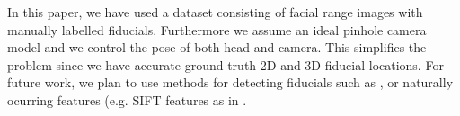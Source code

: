 \documentclass[runningheads]{llncs}
\begin{document}
In this paper, we have used a dataset consisting of facial range images with manually labelled fiducials.    
Furthermore we assume an ideal pinhole camera model and we control the pose of both head and camera.  
This simplifies the problem since we have accurate ground truth 2D and 3D fiducial locations. 
For future work, we plan to use methods for detecting fiducials such as \cite{belhumeur2011localizing}, or naturally ocurring features (e.g. SIFT features \cite{lowe} as in \cite{ohayon2006robust}.    



\end{document}
